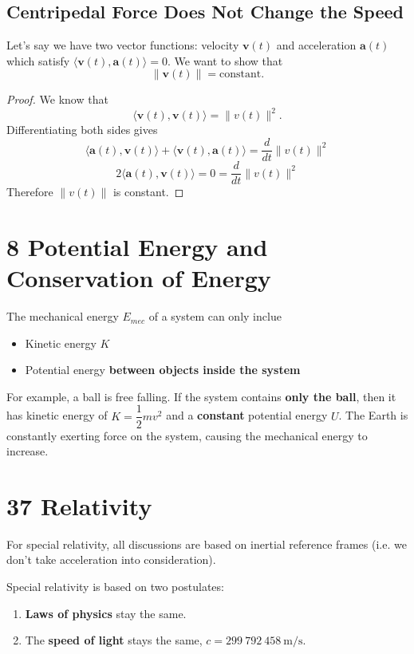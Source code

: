 \documentclass[12pt,a4paper]{report}
\begin{document}
  \subsection*{Centripedal Force Does Not Change the Speed}
  Let's say we have two vector functions: velocity \(\mathbf v(t)\) and acceleration \(\mathbf a(t)\) which satisfy \(\langle \mathbf v(t), \mathbf a(t)\rangle = 0\). We want to show that
  \[\|\mathbf v(t)\| = \text{constant}.\]
  
  \begin{proof}
    We know that
    \[\langle \mathbf v(t), \mathbf v(t)\rangle = \|v(t)\|^2.\]
    Differentiating both sides gives
    \[\langle \mathbf a(t), \mathbf v(t)\rangle + \langle \mathbf v(t), \mathbf a(t)\rangle = \frac{d}{dt}\|v(t)\|^2\]
    \[2\langle \mathbf a(t), \mathbf v(t)\rangle = 0 = \frac{d}{dt}\|v(t)\|^2\]
    Therefore \(\|v(t)\|\) is constant. 
  \end{proof}

  \section*{8 Potential Energy and Conservation of Energy}
  The mechanical energy \(E_{mec}\) of a system can only inclue 
  \begin{itemize}
    \item Kinetic energy \(K\)  
    \item Potential energy \textbf{between objects inside the system}
  \end{itemize}
  
  For example, a ball is free falling. If the system contains \textbf{only the ball}, then it has kinetic energy of \(K = \dfrac 1 2 mv^2\) and a \textbf{constant} potential energy \(U\). The Earth is constantly exerting force on the system, causing the mechanical energy to increase.  

  \section*{37 Relativity}
  For special relativity, all discussions are based on inertial reference frames (i.e. we don't take acceleration into consideration).

  Special relativity is based on two postulates: 
  \begin{enumerate}
    \item \textbf{Laws of physics} stay the same.
    \item The \textbf{speed of light} stays the same, $c = 299\ 792\ 458\ \mathrm{m/s}$.
  \end{enumerate}
  
\end{document}
